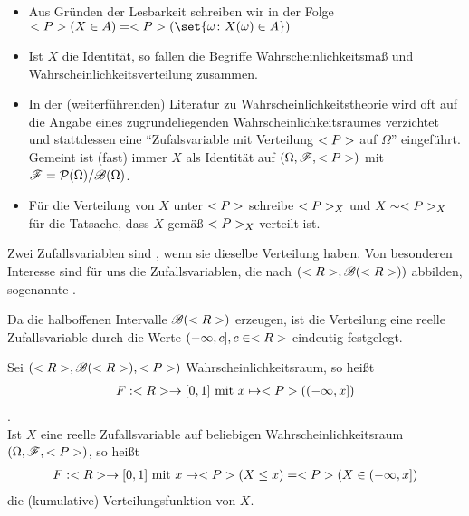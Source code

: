 \begin{*remark}
	\begin{itemize}
		\item Aus Gründen der Lesbarkeit schreiben wir in der Folge $\probp(X \in A) = \probp(\set{\omega \colon X(\omega) \in A})$
		\item Ist $X$ die Identität, so fallen die Begriffe Wahrscheinlichkeitsmaß und Wahrscheinlichkeitsverteilung zusammen.
		\item In der (weiterführenden) Literatur zu Wahrscheinlichkeitstheorie wird oft auf die Angabe eines zugrundeliegenden Wahrscheinlichkeitsraumes verzichtet und stattdessen eine ``Zufalsvariable mit Verteilung $<P>$ auf $\Omega$'' eingeführt.
		Gemeint ist (fast) immer $X$ als Identität auf $(\Omega, \mathscr{F}, <P>)$ mit $\mathscr{F} = \mathcal{P}(\Omega) / \mathscr{B}(\Omega)$.
		\item Für die Verteilung von $X$ unter $<P>$ schreibe $<P>_{X}$ und $X \sim <P>_{X}$ für die Tatsache, dass $X$ gemäß $<P>_{X}$ verteilt ist.
	\end{itemize}
\end{*remark}

\begin{definition}
	Zwei Zufallsvariablen sind , wenn sie dieselbe Verteilung haben.
	Von besonderen Interesse sind für uns die Zufallsvariablen, die nach $(<R>, \mathscr{B}(<R>))$ abbilden, sogenannte .
\end{definition}

Da die halboffenen Intervalle $\mathscr{B}(<R>)$ erzeugen, ist die Verteilung eine reelle Zufallsvariable durch die Werte $(-\infty, c], c \in <R>$ eindeutig festgelegt.

\begin{definition}
	Sei $(<R>, \mathscr{B}(<R>), <P>)$ Wahrscheinlichkeitsraum, so heißt
	\begin{align}
		F: <R> \to [0,1] \text{ mit } x \mapsto <P>((-\infty, x]) \notag
	\end{align}
	.\\
	Ist $X$ eine reelle Zufallsvariable auf beliebigen Wahrscheinlichkeitsraum $(\Omega, \mathscr{F}, <P>)$, so heißt
	\begin{align}
		F: <R> \to [0,1] \text{ mit } x \mapsto <P>(X \le x) = <P>(X \in (-\infty, x]) \notag
	\end{align} %
	die (kumulative) Verteilungsfunktion von $X$.
\end{definition}

